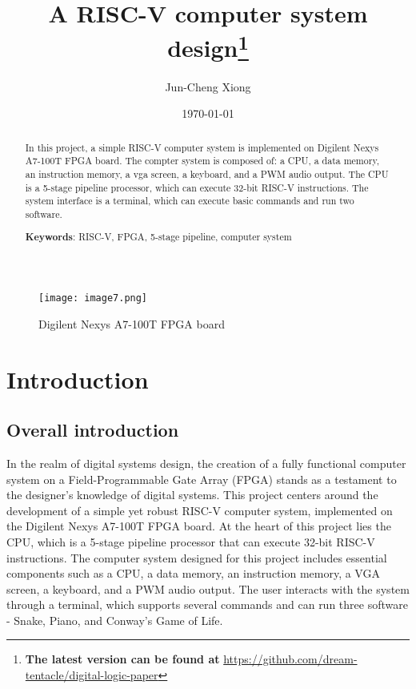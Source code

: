 \documentclass[
	a4paper, %
	11pt, %
]{CSUniSchoolLabReport}
\title{A RISC-V computer system design\thanks{\textbf{The latest version can be found at} \url{https://github.com/dream-tentacle/digital-logic-paper}}}
\author{Jun-Cheng Xiong} %
\date{\today} %
\begin{document}
\maketitle %


\begin{abstract}
    \large{
        In this project, a simple RISC-V computer system is implemented on Digilent Nexys A7-100T FPGA board. The compter system is composed of: a CPU, a data memory, an instruction memory, a vga screen, a keyboard, and a PWM audio output. The CPU is a 5-stage pipeline processor, which can execute 32-bit RISC-V instructions. The system interface is a terminal, which can execute basic commands and run two software.

        \textbf{Keywords}: RISC-V, FPGA, 5-stage pipeline, computer system
    }
\end{abstract}
\thispagestyle{empty}
\newpage

\thispagestyle{empty}
\tableofcontents
\quad
\begin{figure}[h]
    \centering
    \texttt{[image: image7.png]}
    \caption{Digilent Nexys A7-100T FPGA board}
    \label{fig:image7}
\end{figure}


\newpage
\setcounter{page}{1}
\section{Introduction}
\subsection{Overall introduction}

In the realm of digital systems design, the creation of a fully functional computer system on a Field-Programmable Gate Array (FPGA) stands as a testament to the designer's knowledge of digital systems. This project centers around the development of a simple yet robust RISC-V computer system, implemented on the Digilent Nexys A7-100T FPGA board. At the heart of this project lies the CPU, which is a 5-stage pipeline processor that can execute 32-bit RISC-V instructions. The computer system designed for this project includes essential components such as a CPU, a data memory, an instruction memory, a VGA screen, a keyboard, and a PWM audio output. The user interacts with the system through a terminal, which supports several commands and can run three software - Snake, Piano, and Conway's Game of Life.
\end{document}
